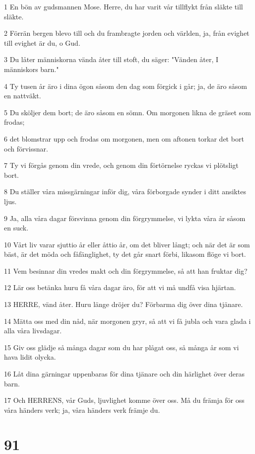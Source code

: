 \par 1 En bön av gudsmannen Mose. Herre, du har varit vår tillflykt från släkte till släkte.
\par 2 Förrän bergen blevo till och du frambragte jorden och världen, ja, från evighet till evighet är du, o Gud.
\par 3 Du låter människorna vända åter till stoft, du säger: "Vänden åter, I människors barn."
\par 4 Ty tusen år äro i dina ögon såsom den dag som förgick i går; ja, de äro såsom en nattväkt.
\par 5 Du sköljer dem bort; de äro såsom en sömn. Om morgonen likna de gräset som frodas;
\par 6 det blomstrar upp och frodas om morgonen, men om aftonen torkar det bort och förvissnar.
\par 7 Ty vi förgås genom din vrede, och genom din förtörnelse ryckas vi plötsligt bort.
\par 8 Du ställer våra missgärningar inför dig, våra förborgade synder i ditt ansiktes ljus.
\par 9 Ja, alla våra dagar försvinna genom din förgrymmelse, vi lykta våra år såsom en suck.
\par 10 Vårt liv varar sjuttio år eller åttio år, om det bliver långt; och när det är som bäst, är det möda och fåfänglighet, ty det går snart förbi, likasom flöge vi bort.
\par 11 Vem besinnar din vredes makt och din förgrymmelse, så att han fruktar dig?
\par 12 Lär oss betänka huru få våra dagar äro, för att vi må undfå visa hjärtan.
\par 13 HERRE, vänd åter. Huru länge dröjer du? Förbarma dig över dina tjänare.
\par 14 Mätta oss med din nåd, när morgonen gryr, så att vi få jubla och vara glada i alla våra livsdagar.
\par 15 Giv oss glädje så många dagar som du har plågat oss, så många år som vi hava lidit olycka.
\par 16 Låt dina gärningar uppenbaras för dina tjänare och din härlighet över deras barn.
\par 17 Och HERRENS, vår Guds, ljuvlighet komme över oss. Må du främja för oss våra händers verk; ja, våra händers verk främje du.

\chapter{91}

